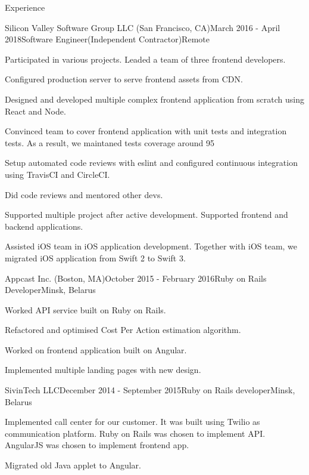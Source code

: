 \documentclass{resume}
\begin{document}
\begin{rSection}{Experience}
    \begin{rSubsection}{Silicon Valley Software Group LLC (San Francisco, CA)}{March 2016 - April 2018}{Software Engineer(Independent Contractor)}{Remote}
    \item Participated in various projects. Leaded a team of three frontend developers.
    \item Configured production server to serve frontend assets from CDN.
    \item Designed and developed multiple complex frontend application from scratch using React and Node.
    \item Convinced team to cover frontend application with unit tests and integration tests. As a result, we maintaned tests coverage around 95%
    \item Setup automated code reviews with eslint and configured continuous integration using TravisCI and CircleCI.
    \item Did code reviews and mentored other devs.
    \item Supported multiple project after active development. Supported frontend and backend applications.
    \item Assisted iOS team in iOS application development. Together with iOS team, we migrated iOS application from Swift 2 to Swift 3.
    \end{rSubsection}

    \begin{rSubsection}{Appcast Inc. (Boston, MA)}{October 2015 - February 2016}{Ruby on Rails Developer}{Minsk, Belarus}
    \item Worked API service built on Ruby on Rails.
    \item Refactored and optimised Cost Per Action estimation algorithm.
    \item Worked on frontend application built on Angular.
    \item Implemented multiple landing pages with new design.
    \end{rSubsection}

    \begin{rSubsection}{SivinTech LLC}{December 2014 - September 2015}{Ruby on Rails developer}{Minsk, Belarus}
    \item Implemented call center for our customer. It was built using Twilio as communication platform. Ruby on Rails was chosen to implement API. AngularJS was chosen to implement frontend app.
    \item Migrated old Java applet to Angular.
    \end{rSubsection}
  \end{rSection}
\end{document}
